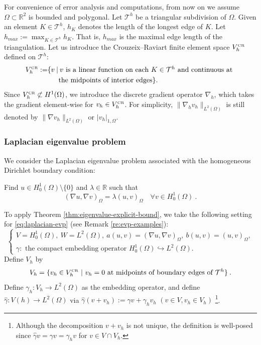 \documentclass[a4,11pt]{article}
\numberwithin{equation}{section}
\newcommand{\CR}{\mbox{\tiny{CR}}}
\begin{document}
For convenience of error analysis and computations, 
from now on we assume $\Omega\subset\mathbb{R}^2$ is bounded and polygonal.  Let $\mathcal{T}^h$ be a triangular subdivision of $\Omega$.
Given an element $K \in \mathcal{T}^h$, $h_K$ denotes the length of the longest edge of $K$. 
Let $h_{max}:=\max_{K\in \mathcal{T}^h} h_K$. That is, $h_{max}$ 
is the maximal edge length of the triangulation. 
Let us introduce the Crouzeix--Raviart finite element space ${V}_h^{\CR}$ defined on $\mathcal{T}^h$:
\begin{equation}
\label{fem space}
\begin{split}
{V}_h^{\CR} := & \{  v \:|\: v \mbox{ is a linear function on each $K\in \mathcal{T}^h$ and continuous at }\\
 & \mspace{28mu} \mbox{the midpoints of  interior edges}\}.
\end{split}
\end{equation}
Since ${V}_h^{\CR} \not\subset H^1(\Omega)$, we introduce the discrete gradient operator $\nabla_h$, which takes the gradient element-wise for $v_h\in {V}_h^{\CR}$. For simplicity, 
$\| \nabla_h v_h \|_{L^2(\Omega)}$ is still denoted by $\| \nabla v_h \|_{L^2(\Omega)}$ or $|v_h|_{1,\Omega}$.


\subsubsection{Laplacian eigenvalue problem}

We consider the Laplacian eigenvalue problem associated with the homogeneous Dirichlet boundary condition:

\medskip

Find $u\in H_0^1(\Omega)\setminus \{0\}$ and $\lambda \in \mathbb{R}$ such that
\begin{equation}
\label{eq:laplacian-evp}
(\nabla u, \nabla v)_\Omega=\lambda (u,v)_\Omega\quad \forall v\in H_0^1(\Omega)~.
\end{equation}

To apply Theorem \ref{thm:eigenvalue-explicit-bound}, we take the following setting for \eqref{eq:laplacian-evp} (see Remark \ref{re:evp-examples}):
$$
  \left\{
    \begin{array}{l} 
      \displaystyle V=H^1_0(\Omega), ~W=L^2(\Omega),~
      \displaystyle a(u,v)=(\nabla u, \nabla v)_\Omega, ~ b(u,v)=(u,v)_\Omega, \\      
\gamma : \mbox{ the compact embedding operator $H^1_0(\Omega)\hookrightarrow L^2(\Omega)$}.  
    \end{array}
  \right.
$$
Define $V_h$ by
$$
V_h=\{v_h \in V_h^{\CR}~|~ v_h=0 \text{ at midpoints of boundary edges of }\mathcal{T}^h \}\:.
$$
Define ${\gamma}_h: V_h \to L^2(\Omega)$ as the embedding operator, 
and define $\hat{\gamma} : V(h)\to L^2(\Omega)$ via 
$\hat{\gamma} (v+v_h):=\gamma v + \gamma_h v_h$ $(v\in V, v_h \in V_h)$ \footnote{Although the decomposition $v+v_h$ is not unique, the definition is well-posed since $\widehat{\gamma} v = \gamma v = \gamma_h v$ for $v\in V\cap {V_h}$.}.
%
\end{document}
